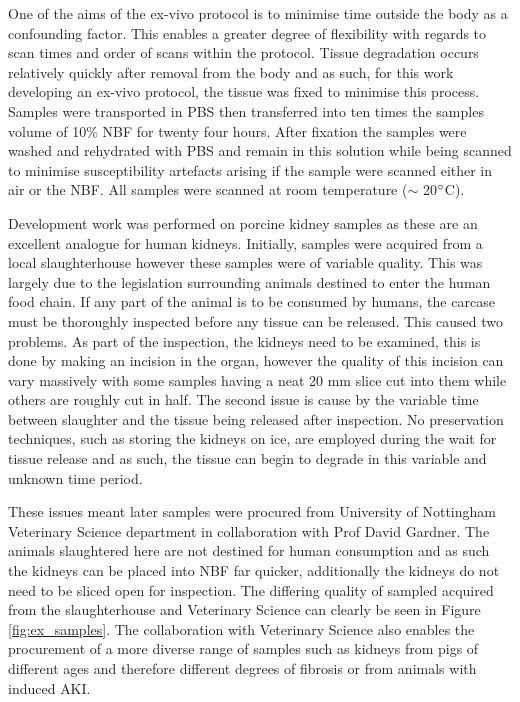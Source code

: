 One of the aims of the ex-vivo protocol is to minimise time outside the body as a confounding factor. This enables a greater degree of flexibility with regards to scan times and order of scans within the protocol. Tissue degradation occurs relatively quickly after removal from the body and as such, for this work developing an ex-vivo protocol, the tissue was fixed to minimise this process. Samples were transported in \acf{PBS} then transferred into ten times the samples volume of 10\% \acf{NBF} for twenty four hours. After fixation the samples were washed and rehydrated with \ac{PBS} and remain in this solution while being scanned to minimise susceptibility artefacts arising if the sample were scanned either in air or the \ac{NBF}. All samples were scanned at room temperature ($\sim$ 20$\degree$C).

\newpage
Development work was performed on porcine kidney samples as these are an excellent analogue for human kidneys. Initially, samples were acquired from a local slaughterhouse however these samples were of variable quality. This was largely due to the legislation surrounding animals destined to enter the human food chain. If any part of the animal is to be consumed by humans, the carcase must be thoroughly inspected before any tissue can be released. This caused two problems. As part of the inspection, the kidneys need to be examined, this is done by making an incision in the organ, however the quality of this incision can vary massively with some samples having a neat 20 mm slice cut into them while others are roughly cut in half. The second issue is cause by the variable time between slaughter and the tissue being released after inspection. No preservation techniques, such as storing the kidneys on ice, are employed during the wait for tissue release and as such, the tissue can begin to degrade in this variable and unknown time period.

These issues meant later samples were procured from University of Nottingham Veterinary Science department in collaboration with Prof David Gardner. The animals slaughtered here are not destined for human consumption and as such the kidneys can be placed into \ac{NBF} far quicker, additionally the kidneys do not need to be sliced open for inspection. The differing quality of sampled acquired from the slaughterhouse and Veterinary Science can clearly be seen in Figure \ref{fig:ex_samples}. The collaboration with Veterinary Science also enables the procurement of a more diverse range of samples such as kidneys from pigs of different ages and therefore different degrees of fibrosis or from animals with induced \ac{AKI}.  

